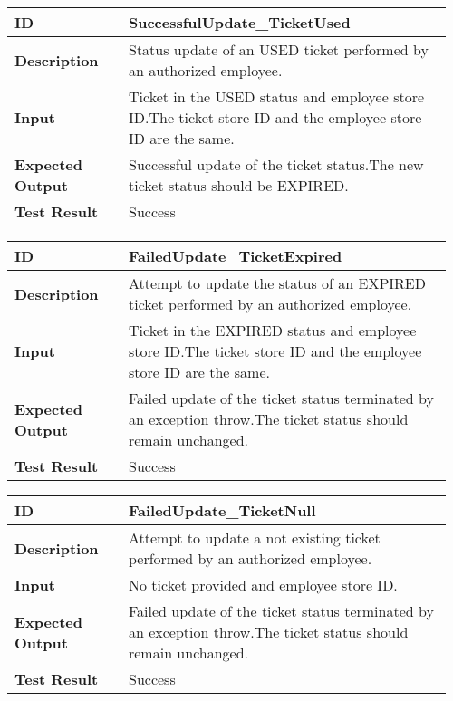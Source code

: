 \begin{table}[H]
	\centering
	\begin{tabular}{@{}p{0.25\linewidth}p{0.71\linewidth}@{}}
		\toprule
		\textbf{ID} & SuccessfulUpdate\_TicketUsed \\
		\midrule
		\textbf{Description} & Status update of an USED ticket performed by an authorized employee. \\
		\midrule
		\textbf{Input} & Ticket in the USED status and employee store ID.\newline The ticket store ID and the employee store ID are the same.\\
		\midrule
		\textbf{Expected Output} & Successful update of the ticket status.\newline The new ticket status should be EXPIRED. \\
		\midrule
		\textbf{Test Result} & Success\\
		\bottomrule
	\end{tabular}
\end{table}

\begin{table}[H]
	\centering
	\begin{tabular}{@{}p{0.25\linewidth}p{0.71\linewidth}@{}}
		\toprule
		\textbf{ID} & FailedUpdate\_TicketExpired \\
		\midrule
		\textbf{Description} & Attempt to update the status of an EXPIRED ticket performed by an authorized employee. \\
		\midrule
		\textbf{Input} & Ticket in the EXPIRED status and employee store ID.\newline The ticket store ID and the employee store ID are the same.\\
		\midrule
		\textbf{Expected Output} & Failed update of the ticket status terminated by an exception throw.\newline The ticket status should remain unchanged. \\
		\midrule
		\textbf{Test Result} & Success\\
		\bottomrule
	\end{tabular}
\end{table}

\begin{table}[H]
	\centering
	\begin{tabular}{@{}p{0.25\linewidth}p{0.71\linewidth}@{}}
		\toprule
		\textbf{ID} & FailedUpdate\_TicketNull \\
		\midrule
		\textbf{Description} & Attempt to update a not existing ticket performed by an authorized employee. \\
		\midrule
		\textbf{Input} & No ticket provided and employee store ID.\\
		\midrule
		\textbf{Expected Output} & Failed update of the ticket status terminated by an exception throw.\newline The ticket status should remain unchanged. \\
		\midrule
		\textbf{Test Result} & Success\\
		\bottomrule
	\end{tabular}
\end{table}


